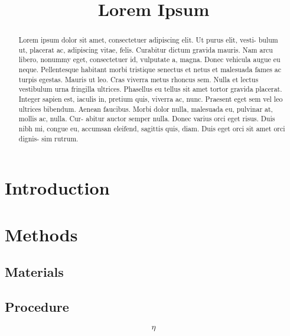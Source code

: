 \documentclass[a4paper,12pt]{hlsart}
\title{Lorem Ipsum}
\begin{document}
\maketitle
\begin{abstract}
  Lorem ipsum dolor sit amet, consectetuer adipiscing elit. Ut purus elit,
  vesti- bulum ut, placerat ac, adipiscing vitae, felis. Curabitur dictum
  gravida mauris. Nam arcu libero, nonummy eget, consectetuer id, vulputate
  a, magna. Donec vehicula augue eu neque. Pellentesque habitant morbi
  tristique senectus et netus et malesuada fames ac turpis egestas. Mauris ut
  leo. Cras viverra metus rhoncus sem. Nulla et lectus vestibulum urna
  fringilla ultrices. Phasellus eu tellus sit amet tortor gravida placerat.
  Integer sapien est, iaculis in, pretium quis, viverra ac, nunc. Praesent
  eget sem vel leo ultrices bibendum. Aenean faucibus. Morbi dolor nulla,
  malesuada eu, pulvinar at, mollis ac, nulla. Cur- abitur auctor semper
  nulla. Donec varius orci eget risus. Duis nibh mi, congue eu, accumsan
  eleifend, sagittis quis, diam. Duis eget orci sit amet orci dignis- sim
  rutrum.
\end{abstract}

\section{Introduction}
\lipsum[2-3]

\section{Methods}
\subsection{Materials}
\lipsum[4-5]

\subsection{Procedure}
\lipsum[5-6]



\large{\[\eta\]}
\end{document}
